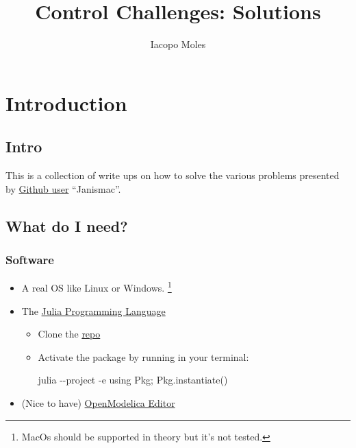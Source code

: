 \documentclass[
  a4paper,
  DIV=11,
  numbers=noendperiod]{scrreprt}
\title{Control Challenges: Solutions}
\author{Iacopo Moles}
\date{}
\newenvironment{Shaded}{\begin{snugshade}}{\end{snugshade}}
\newcommand{\AttributeTok}[1]{\textcolor[rgb]{0.40,0.45,0.13}{#1}}
\newcommand{\ExtensionTok}[1]{\textcolor[rgb]{0.00,0.23,0.31}{#1}}
\newcommand{\StringTok}[1]{\textcolor[rgb]{0.13,0.47,0.30}{#1}}
\renewcommand*\contentsname{Table of contents}
\newcommand\contentsname{Table of contents}
\begin{document}
\maketitle


\renewcommand*\contentsname{Table of contents}
{
\hypersetup{linkcolor=}
\setcounter{tocdepth}{2}
\tableofcontents
}


\chapter{Introduction}\label{introduction}

\section{Intro}\label{sec-home}

This is a collection of write ups on how to solve the various problems
presented by \href{https://janismac.github.io/ControlChallenges/}{Github
user} ``Janismac''.

\section{What do I need?}\label{what-do-i-need}

\subsection{Software}\label{software}

\begin{itemize}
\item
  A real OS like Linux or Windows. \footnote{MacOs should be supported
    in theory but it's not tested.}
\item
  The \href{https://julialang.org/install/}{Julia Programming Language}

  \begin{itemize}
  \item
    Clone the
    \href{https://github.com/icpmoles/controlchallengessolutions}{repo}
  \item
    Activate the package by running in your terminal:

\begin{Shaded}
\begin{Highlighting}[]
\ExtensionTok{julia} \AttributeTok{{-}{-}project} \AttributeTok{{-}e} \StringTok{\textquotesingle{}using Pkg; Pkg.instantiate()\textquotesingle{}}
\end{Highlighting}
\end{Shaded}
  \end{itemize}
\item
  (Nice to have) \href{https://openmodelica.org/}{OpenModelica Editor}
\end{itemize}
\end{document}
